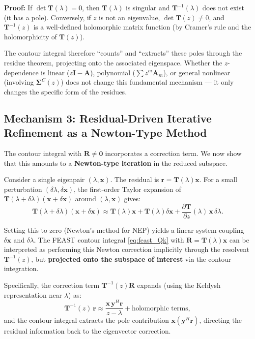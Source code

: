 \documentclass[12pt,a4paper]{article}
\theoremstyle{definition}
\begin{document}
\textbf{Proof:} If $\det\mathbf{T}(\lambda) = 0$, then $\mathbf{T}(\lambda)$ is singular and $\mathbf{T}^{-1}(\lambda)$ does not exist (it has a pole). Conversely, if $z$ is not an eigenvalue, $\det\mathbf{T}(z) \neq 0$, and $\mathbf{T}^{-1}(z)$ is a well-defined holomorphic matrix function (by Cramer's rule and the holomorphicity of $\mathbf{T}(z)$).

The contour integral therefore ``counts'' and ``extracts'' these poles through the residue theorem, projecting onto the associated eigenspace. Whether the $z$-dependence is linear ($z\mathbf{I} - \mathbf{A}$), polynomial ($\sum z^{m}\mathbf{A}_m$), or general nonlinear (involving $\mathbf{\Sigma}^{C}(z)$) does not change this fundamental mechanism --- it only changes the specific form of the residues.

\subsection{Mechanism 3: Residual-Driven Iterative Refinement as a Newton-Type Method}

The contour integral with $\mathbf{R} \neq \mathbf{0}$ incorporates a correction term. We now show that this amounts to a \textbf{Newton-type iteration} in the reduced subspace.

Consider a single eigenpair $(\lambda, \mathbf{x})$. The residual is $\mathbf{r} = \mathbf{T}(\lambda)\mathbf{x}$. For a small perturbation $(\delta\lambda, \delta\mathbf{x})$, the first-order Taylor expansion of $\mathbf{T}(\lambda + \delta\lambda)(\mathbf{x} + \delta\mathbf{x})$ around $(\lambda, \mathbf{x})$ gives:
\begin{equation}\label{eq:taylor}
\mathbf{T}(\lambda + \delta\lambda)(\mathbf{x} + \delta\mathbf{x}) \approx \mathbf{T}(\lambda)\mathbf{x} + \mathbf{T}(\lambda)\delta\mathbf{x} + \frac{\partial\mathbf{T}}{\partial z}(\lambda)\,\mathbf{x}\,\delta\lambda.
\end{equation}

Setting this to zero (Newton's method for NEP) yields a linear system coupling $\delta\mathbf{x}$ and $\delta\lambda$. The FEAST contour integral \eqref{eq:feast_Qk} with $\mathbf{R} = \mathbf{T}(\lambda)\mathbf{x}$ can be interpreted as performing this Newton correction implicitly through the resolvent $\mathbf{T}^{-1}(z)$, but \textbf{projected onto the subspace of interest} via the contour integration.

Specifically, the correction term $\mathbf{T}^{-1}(z)\mathbf{R}$ expands (using the Keldysh representation near $\lambda$) as:
\begin{equation}\label{eq:correction_expansion}
\mathbf{T}^{-1}(z)\,\mathbf{r} \approx \frac{\mathbf{x}\,\mathbf{y}^{H}\mathbf{r}}{z - \lambda} + \text{holomorphic terms},
\end{equation}
and the contour integral extracts the pole contribution $\mathbf{x}(\mathbf{y}^{H}\mathbf{r})$, directing the residual information back to the eigenvector correction.
\end{document}
